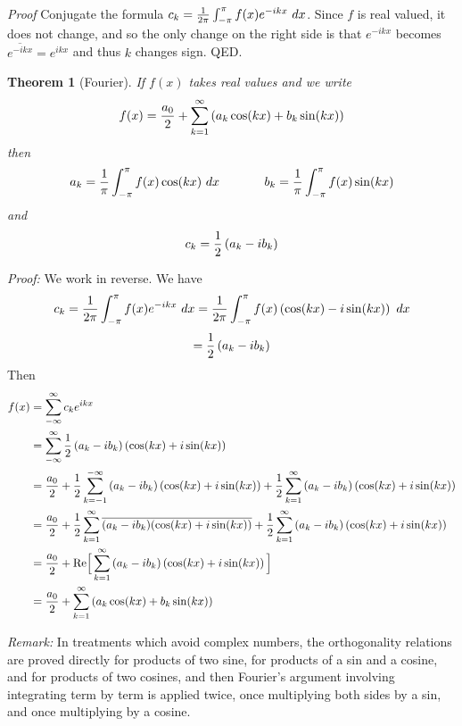 \documentclass[11pt, oneside]{article}   	%
\newtheorem{theorem}{Theorem}
\def\Re{\mbox{Re}}
\begin{document}
{\em Proof} Conjugate the formula $c_k = {1 \over {2 \pi}} \int_{- \pi}^\pi f(x) e^{- i k x} \ dx$. Since $f$ is real valued, it does not change, and so the only change on the right side is that $e^{-i k x}$ becomes
$\overline{e^{- i k x}} = e^{i k x}$ and thus $k$ changes sign. QED.



 \begin{theorem}[Fourier]
 If $f(x)$ takes real values and we write
 \[f(x) = {{a_0} \over 2} + \sum_{k = 1}^\infty \left( a_k \cos(kx) + b_k \sin(kx) \right)\]
 then
\[a_k = {1 \over \pi} \int_{- \pi}^\pi f(x) \cos(kx) \ dx \hspace{.5in}  b_k = {1 \over \pi} \int_{- \pi}^\pi f(x) \sin(kx)\]
and
\[c_k = {1 \over 2} \left( a_k - i b_k \right)\]
 \end{theorem}
 
 {\em Proof:} We work in reverse. We have
 \[c_k  = {1 \over {2 \pi}} \int_{- \pi}^\pi f(x) e^{- ikx} \ dx =  {1 \over {2 \pi}} \int_{- \pi}^\pi f(x) \left( \cos(kx) - i \sin(kx) \right) \ dx\]
 \[ = {1 \over 2} \left( a_k - i b_k \right)\] 
 Then
 \begin{align*}
 f(x) &= \sum_{- \infty}^\infty c_k e^{ikx} \\
 &= \sum_{- \infty}^\infty {1 \over 2} \left( a_k - i b_k \right) \left( \cos (kx) + i \sin(kx) \right) \\
 &= {{a_0} \over 2} + {1 \over 2}  \sum_{k = -1}^{-\infty} \left( a_k - i b_k \right) \left( \cos (kx) + i \sin(kx) \right) +  {1 \over 2} \sum_{k = 1}^\infty \left( a_k - i b_k \right) \left( \cos (kx) + i \sin(kx) \right) \\
 &= {{a_0} \over 2} + {1 \over 2}  \sum_{k = 1}^{\infty} \overline{\left( a_k - i b_k \right)} \overline{ \left( \cos (kx) + i \sin(kx) \right) }+ {1 \over 2} \sum_{k = 1}^\infty \left( a_k - i b_k \right) \left( \cos (kx) + i \sin(kx) \right)\\ 
 &= {{a_0} \over 2} + \Re \Big[  \sum_{k = 1}^\infty \left( a_k - i b_k \right) \left( \cos (kx) + i \sin(kx) \right) \Big] \\
 &= {{a_0} \over 2} + \sum_{k = 1}^\infty \left( a_k \cos(kx) + b_k \sin(kx) \right)
 \end{align*}
 
 {\em Remark:} In treatments which avoid complex numbers, the orthogonality relations are proved directly for products of two sine, for products of a sin and a cosine, and for products of two cosines, and then Fourier's argument involving integrating term by term is applied twice, once multiplying both sides by a sin, and once multiplying by a cosine.
 
\end{document}
